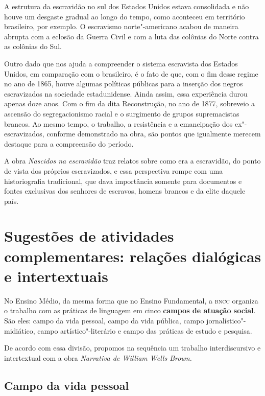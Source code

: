 \documentclass[12pt]{extarticle}
\begin{document}
A estrutura da escravidão no sul dos Estados Unidos estava consolidada e
não houve um desgaste gradual ao longo do tempo, como aconteceu em
território brasileiro, por exemplo. O escravismo norte"-americano acabou
de maneira abrupta com a eclosão da Guerra Civil e com a luta das
colônias do Norte contra as colônias do Sul.

Outro dado que nos ajuda a compreender o sistema escravista dos Estados
Unidos, em comparação com o brasileiro, é o fato de que, com o fim desse
regime no ano de 1865, houve algumas políticas públicas para a inserção
dos negros escravizados na sociedade estadunidense. Ainda assim, essa
experiência durou apenas doze anos. Com o fim da dita Reconstrução, no
ano de 1877, sobreveio a ascensão do segregacionismo racial e o
surgimento de grupos supremacistas brancos. Ao mesmo tempo, o trabalho,
a resistência e a emancipação dos ex"-escravizados, conforme demonstrado
na obra, são pontos que igualmente merecem destaque para a compreensão
do período.

A obra \emph{Nascidos na escravidão} traz relatos sobre como era a
escravidão, do ponto de vista dos próprios escravizados, e essa
perspectiva rompe com uma historiografia tradicional, que dava
importância somente para documentos e fontes exclusivas dos senhores de
escravos, homens brancos e da elite daquele país.

\section{Sugestões de atividades complementares: relações dialógicas e intertextuais}



No Ensino Médio, da mesma forma que no Ensino Fundamental, a \textsc{bncc}
organiza o trabalho com as práticas de linguagem em cinco \textbf{campos
de atuação social}. São eles: campo da vida pessoal, campo da vida
pública, campo jornalístico"-midiático, campo artístico"-literário e campo
das práticas de estudo e pesquisa.

De acordo com essa divisão, propomos na sequência um trabalho
interdiscursivo e intertextual com a obra \emph{Narrativa de William
Wells Brown.}

\subsection{Campo da vida pessoal}
\end{document}
